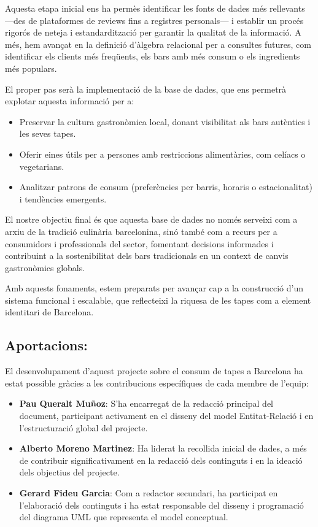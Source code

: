 \documentclass[12pt,a4paper]{article}
\begin{document}
Aquesta etapa inicial ens ha permès identificar les fonts de dades més rellevants —des de plataformes de reviews fins a registres personals— i establir un procés rigorós de neteja i estandardització per garantir la qualitat de la informació. A més, hem avançat en la definició d’àlgebra relacional per a consultes futures, com identificar els clients més freqüents, els bars amb més consum o els ingredients més populars.

El proper pas serà la implementació de la base de dades, que ens permetrà explotar aquesta informació per a:

\begin{itemize}
    \item Preservar la cultura gastronòmica local, donant visibilitat als bars autèntics i les seves tapes.
    \item Oferir eines útils per a persones amb restriccions alimentàries, com celíacs o vegetarians.
    \item Analitzar patrons de consum (preferències per barris, horaris o estacionalitat) i tendències emergents.
\end{itemize}

El nostre objectiu final és que aquesta base de dades no només serveixi com a arxiu de la tradició culinària barcelonina, sinó també com a recurs per a consumidors i professionals del sector, fomentant decisions informades i contribuint a la sostenibilitat dels bars tradicionals en un context de canvis gastronòmics globals.

Amb aquests fonaments, estem preparats per avançar cap a la construcció d’un sistema funcional i escalable, que reflecteixi la riquesa de les tapes com a element identitari de Barcelona.
\subsection{Aportacions:}
El desenvolupament d'aquest projecte sobre el consum de tapes a Barcelona ha estat possible gràcies a les contribucions específiques de cada membre de l'equip:

\begin{itemize}
\item \textbf{Pau Queralt Muñoz}: S'ha encarregat de la redacció principal del document, participant activament en el disseny del model Entitat-Relació i en l'estructuració global del projecte.
\item \textbf{Alberto Moreno Martinez}: Ha liderat la recollida inicial de dades, a més de contribuir significativament en la redacció dels continguts i en la ideació dels objectius del projecte.

\item \textbf{Gerard Fideu Garcia}: Com a redactor secundari, ha participat en l'elaboració dels continguts i ha estat responsable del disseny i programació del diagrama UML que representa el model conceptual.
\end{itemize}
\end{document}
